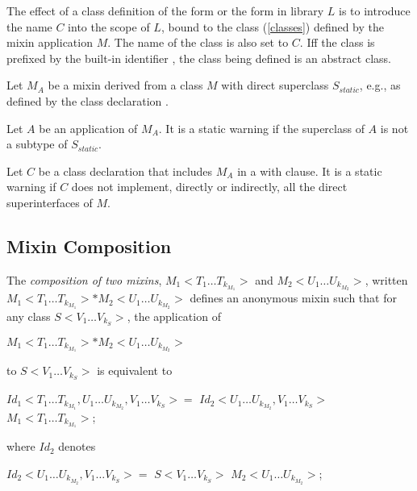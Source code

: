 \documentclass{article}
\begin{document}
\LMHash{}
The effect of a class definition of the form  or the form  in library $L$ is to introduce the name $C$ into the scope of $L$, bound to the class (\ref{classes}) defined by the mixin application $M$.
The name of the class is also set to $C$.
If{}f the class is prefixed by the built-in identifier \ABSTRACT{}, the class being defined is an abstract class.

Let $M_A$ be a mixin derived from a class $M$ with direct superclass $S_{static}$, e.g., as defined by the class declaration .

Let $A$ be an application of $M_A$.
It is a static warning if the superclass of $A$ is not a subtype of $S_{static}$.

Let $C$ be a class declaration that includes $M_A$ in a with clause.
It is a static warning if $C$ does not implement, directly or indirectly, all the direct superinterfaces of $M$.


\subsection{Mixin Composition}


\LMHash{}
The {\em composition of two mixins}, $M_1<T_1 \ldots T_{k_{M_1}}>$ and $M_2<U_1 \ldots U_{k_{M_2}}>$, written $M_1<T_1 \ldots T_{k_{M_1}}> * M_2<U_1 \ldots U_{k_{M_2}}>$ defines an anonymous mixin such that for any class $S<V_1 \ldots V_{k_S}>$, the application of

$M_1<T_1 \ldots T_{k_{M_1}}> * M_2<U_1 \ldots U_{k_{M_2}}>$

to $S<V_1 \ldots V_{k_S}>$ is equivalent to

\begin{dartCode}
\ABSTRACT{} \CLASS{} $Id_1<T_1 \ldots T_{k_{M_1}}, U_1 \ldots U_{k_{M_2}}, V_1 \ldots V_{k_S}> = $
      $Id_2<U_1 \ldots U_{k_{M_2}}, V_1 \ldots V_{k_S}>$ \WITH{} $M_1 <T_1 \ldots T_{k_{M_1}}>$;
\end{dartCode}

where $Id_2$ denotes

\begin{dartCode}
\ABSTRACT{} \CLASS{} $Id_2<U_1 \ldots U_{k_{M_2}}, V_1 \ldots V_{k_S}> =$
                         $S<V_1 \ldots V_{k_S}>$ \WITH{} $M_2<U_1 \ldots U_{k_{M_2}}>$;
\end{dartCode}
\end{document}
